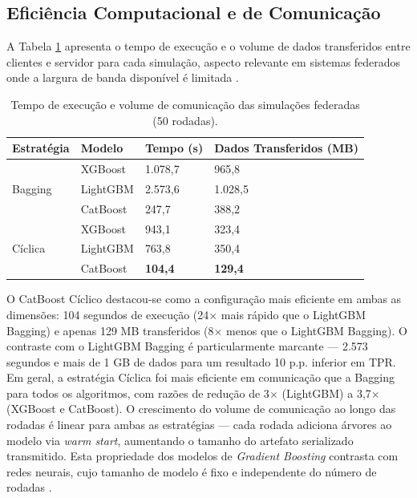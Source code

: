 \subsection{Eficiência Computacional e de Comunicação}

A Tabela \ref{tab:eficiencia} apresenta o tempo de execução e o volume de dados transferidos entre clientes e servidor para cada simulação, aspecto relevante em sistemas federados onde a largura de banda disponível é limitada \cite{konecny2016communication}.

\begin{table}[H]
\centering
\small
\begin{tabularx}{\textwidth}{|l|l|X|X|}
\hline
\bf Estratégia & \bf Modelo & \bf Tempo (s) & \bf Dados Transferidos (MB) \\ \hline
\multirow{3}{*}{Bagging} & XGBoost & 1.078,7 & 965,8 \\ \cline{2-4}
 & LightGBM & 2.573,6 & 1.028,5 \\ \cline{2-4}
 & CatBoost & 247,7 & 388,2 \\ \hline
\multirow{3}{*}{Cíclica} & XGBoost & 943,1 & 323,4 \\ \cline{2-4}
 & LightGBM & 763,8 & 350,4 \\ \cline{2-4}
 & CatBoost & \textbf{104,4} & \textbf{129,4} \\ \hline
\end{tabularx}
\caption{Tempo de execução e volume de comunicação das simulações federadas (50 rodadas).}
\label{tab:eficiencia}
\end{table}

O CatBoost Cíclico destacou-se como a configuração mais eficiente em ambas as dimensões: 104 segundos de execução (24$\times$ mais rápido que o LightGBM Bagging) e apenas 129 MB transferidos (8$\times$ menos que o LightGBM Bagging). O contraste com o LightGBM Bagging é particularmente marcante --- 2.573 segundos e mais de 1 GB de dados para um resultado 10 p.p. inferior em TPR. Em geral, a estratégia Cíclica foi mais eficiente em comunicação que a Bagging para todos os algoritmos, com razões de redução de 3$\times$ (LightGBM) a 3,7$\times$ (XGBoost e CatBoost). O crescimento do volume de comunicação ao longo das rodadas é linear para ambas as estratégias --- cada rodada adiciona árvores ao modelo via \textit{warm start}, aumentando o tamanho do artefato serializado transmitido. Esta propriedade dos modelos de \textit{Gradient Boosting} contrasta com redes neurais, cujo tamanho de modelo é fixo e independente do número de rodadas \cite{konecny2016communication}.

